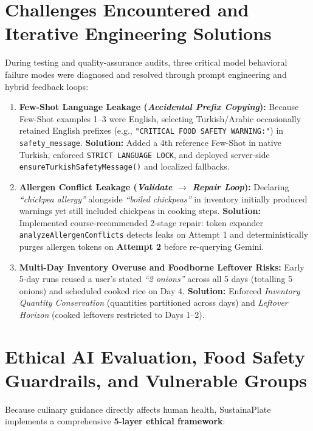 \documentclass[9pt,a4paper]{article}
\begin{document}
\section{Challenges Encountered and Iterative Engineering Solutions}
During testing and quality-assurance audits, three critical model behavioral failure modes were diagnosed and resolved through prompt engineering and hybrid feedback loops:
\begin{enumerate}
  \item \textbf{Few-Shot Language Leakage (\emph{Accidental Prefix Copying}):} Because Few-Shot examples 1--3 were English, selecting Turkish/Arabic occasionally retained English prefixes (e.g., \texttt{"CRITICAL FOOD SAFETY WARNING:"}) in \texttt{safety\_message}. \textbf{Solution:} Added a 4th reference Few-Shot in native Turkish, enforced \texttt{STRICT LANGUAGE LOCK}, and deployed server-side \texttt{ensureTurkishSafetyMessage()} and localized fallbacks.
  \item \textbf{Allergen Conflict Leakage (\emph{Validate $\rightarrow$ Repair Loop}):} Declaring \emph{``chickpea allergy''} alongside \emph{``boiled chickpeas''} in inventory initially produced warnings yet still included chickpeas in cooking steps. \textbf{Solution:} Implemented course-recommended 2-stage repair: token expander \texttt{analyzeAllergenConflicts} detects leaks on Attempt 1 and deterministically purges allergen tokens on \textbf{Attempt 2} before re-querying Gemini.
  \item \textbf{Multi-Day Inventory Overuse and Foodborne Leftover Risks:} Early 5-day runs reused a user's stated \emph{``2 onions''} across all 5 days (totalling 5 onions) and scheduled cooked rice on Day 4. \textbf{Solution:} Enforced \emph{Inventory Quantity Conservation} (quantities partitioned across days) and \emph{Leftover Horizon} (cooked leftovers restricted to Days 1--2).
\end{enumerate}

\section{Ethical AI Evaluation, Food Safety Guardrails, and Vulnerable Groups}
Because culinary guidance directly affects human health, SustainaPlate implements a comprehensive \textbf{5-layer ethical framework}:
\end{document}
